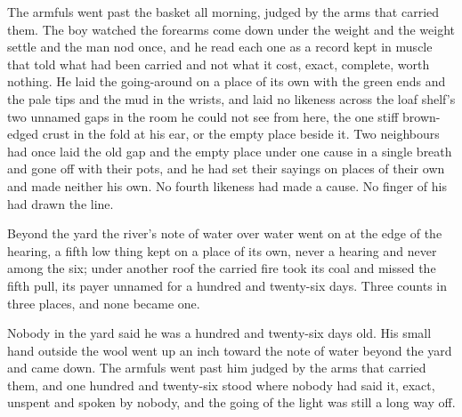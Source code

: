 \scenebreak

The armfuls went past the basket all morning, judged by the arms that carried them. The boy watched the forearms come down under the weight and the weight settle and the man nod once, and he read each one as a record kept in muscle that told what had been carried and not what it cost, exact, complete, worth nothing. He laid the going-around on a place of its own with the green ends and the pale tips and the mud in the wrists, and laid no likeness across the loaf shelf's two unnamed gaps in the room he could not see from here, the one stiff brown-edged crust in the fold at his ear, or the empty place beside it. Two neighbours had once laid the old gap and the empty place under one cause in a single breath and gone off with their pots, and he had set their sayings on places of their own and made neither his own. No fourth likeness had made a cause. No finger of his had drawn the line.

Beyond the yard the river's note of water over water went on at the edge of the hearing, a fifth low thing kept on a place of its own, never a hearing and never among the six; under another roof the carried fire took its coal and missed the fifth pull, its payer unnamed for a hundred and twenty-six days. Three counts in three places, and none became one.

Nobody in the yard said he was a hundred and twenty-six days old. His small hand outside the wool went up an inch toward the note of water beyond the yard and came down. The armfuls went past him judged by the arms that carried them, and one hundred and twenty-six stood where nobody had said it, exact, unspent and spoken by nobody, and the going of the light was still a long way off.
